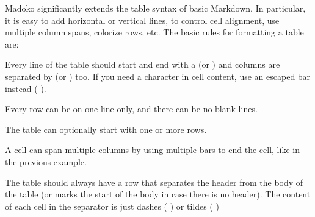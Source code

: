 \documentclass{book}
\begin{document}
\begin{mdP}[class={para-continue},data-line={1010}]%
{}Madoko significantly extends the table syntax of basic Markdown. In particular,
it is easy to add horizontal or vertical lines, to control cell alignment,
use multiple column spans, colorize rows, etc.
The basic rules for formatting a table are:%
\end{mdP}%
\begin{mdUl}[class={list-star,compact},data-line={1015}]%
\begin{mdLi}[data-line={1015}]%
{}Every line of the table should start and end with a %
{}\mdCode[class={code,code1}]{{\textbar}}%
{} (or %
{}\mdCode[class={code,code1}]{+}%
{}) and columns are 
  separated by %
{}\mdCode[class={code,code1}]{{\textbar}}%
{} (or %
{}\mdCode[class={code,code1}]{+}%
{}) too. If you need a %
{}\mdCode[class={code,code1}]{{\textbar}}%
{} character in cell content, use 
  an escaped bar instead (%
{}\mdCode[class={code,code1}]{{\textbackslash}{\textbar}}%
{}).%
\end{mdLi}%
\begin{mdLi}[data-line={1018}]%
{}Every row can be on one line only, and there can be no blank lines.%
\end{mdLi}%
\begin{mdLi}[data-line={1019}]%
{}The table can optionally start with one or more %
{}%
{} rows.%
\end{mdLi}%
\begin{mdLi}[data-line={1020}]%
{}A cell can span multiple columns by using multiple bars to end the cell, like 
{}\mdCode[class={code,code1}]{{\textbar}{\textbar}}%
{} in the previous example.%
\end{mdLi}%
\begin{mdLi}[data-line={1022}]%
{}The table should always have a %
{}%
{} row that separates
  the header from the body of the table (or marks the start of the body in case
  there is no header). The content of each cell in the separator is just
  dashes (%
{}\mdCode[class={code,code1}]{-}%
{}) or tildes (%
{}\mdCode[class={code,code1}]{{\textasciitilde}}%
{})%
\end{mdLi}%
\end{mdUl}%
\end{document}
